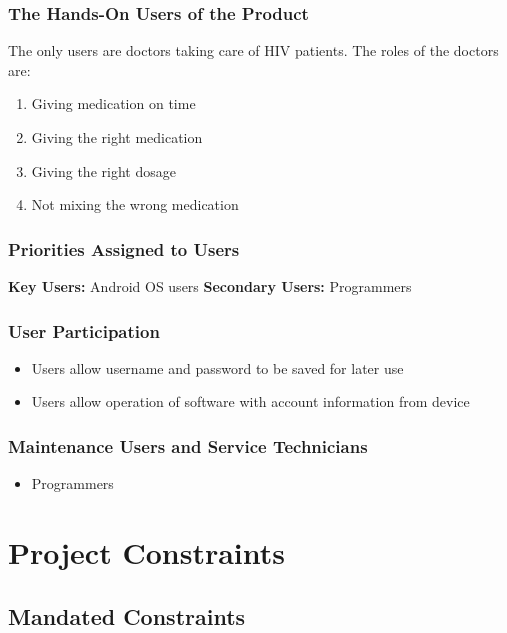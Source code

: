 \documentclass[12pt]{article}
\begin{document}
\subsubsection{The Hands-On Users of the Product}
The only users are doctors taking care of HIV patients. The roles of the doctors are:
\begin{enumerate}
\item Giving medication on time
\item Giving the right medication
\item Giving the right dosage
\item Not mixing the wrong medication
\end{enumerate}

\subsubsection{Priorities Assigned to Users}
{\bf Key Users:} Android OS users
{\bf Secondary Users:} Programmers

\subsubsection{User Participation}
\begin{itemize}
\item Users allow username and password to be saved for later use
\item Users allow operation of software with account information from device
\end{itemize}
\subsubsection{Maintenance Users and Service Technicians}
\begin{itemize}
\item Programmers
\end{itemize}

\section{Project Constraints}
\setcounter{subsection}{3}
\subsection{Mandated Constraints }
\end{document}
